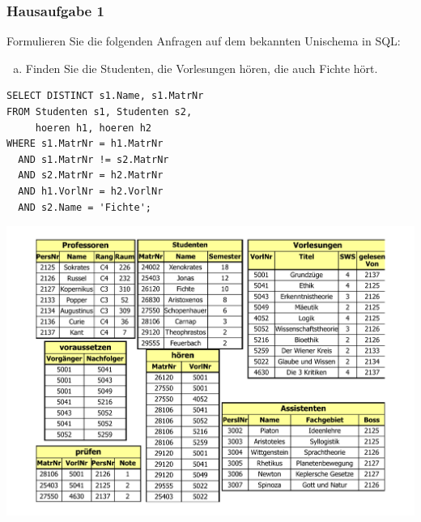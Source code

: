 \begin{frame}[fragile]
	\frametitle{Hausaufgabe 1}
	\vspace{0.5cm}

	\begin{multicols}{2}
		Formulieren Sie die folgenden Anfragen auf dem bekannten Unischema in SQL:
		\begin{enumerate}[b)]
			\item Finden Sie die Studenten, die Vorlesungen hören, die auch Fichte hört.
		\end{enumerate}

		\begin{verbatim}
SELECT DISTINCT s1.Name, s1.MatrNr
FROM Studenten s1, Studenten s2, 
	 hoeren h1, hoeren h2
WHERE s1.MatrNr = h1.MatrNr
  AND s1.MatrNr != s2.MatrNr
  AND s2.MatrNr = h2.MatrNr
  AND h1.VorlNr = h2.VorlNr
  AND s2.Name = 'Fichte';
		\end{verbatim}
		\vfill\columnbreak

		\begin{center}
			\includegraphics[height=.6\paperheight]{../img/uni.pdf}
		\end{center}
	\end{multicols}
\end{frame}

